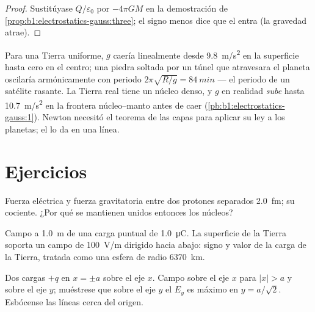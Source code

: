 \begin{proof}
Sustitúyase $Q/\varepsilon_0$ por $-4\pi GM$ en la demostración de
\cref{prop:b1:electrostatics-gauss:three}; el signo menos dice que el
 entra (la gravedad atrae).
\end{proof}

\begin{example}\label{ex:b1:electrostatics-gauss:earth}
Para una Tierra uniforme, $g$ caería linealmente desde \qty{9.8}{m/s^2} en
la superficie hasta cero en el centro; una piedra soltada por un túnel
que atravesara el planeta oscilaría armónicamente con periodo $2\pi\sqrt{R/g} =
\qty{84}{min}$ --- el periodo de un satélite rasante. La Tierra real
tiene un núcleo denso, y $g$ en realidad \emph{sube} hasta
\qty{10.7}{m/s^2} en la frontera núcleo--manto antes de caer (\cref{pb:b1:electrostatics-gauss:1}).
Newton necesitó el teorema de las capas para aplicar su ley a los
planetas; el  lo da en una línea.
\end{example}

\section{Ejercicios}

\begin{exercise}[$\star$]\label{exo:b1:electrostatics-gauss:1}
Fuerza eléctrica y fuerza gravitatoria entre dos protones separados
\qty{2.0}{fm}; su cociente. ¿Por qué se mantienen unidos entonces los núcleos?
\end{exercise}

\begin{exercise}[$\star$]\label{exo:b1:electrostatics-gauss:2}
Campo a \qty{1.0}{m} de una carga puntual de \qty{1.0}{\micro C}. La
superficie de la Tierra soporta un campo de \qty{100}{V/m} dirigido hacia
abajo: signo y valor de la carga de la Tierra, tratada como una esfera de
radio \qty{6370}{km}.
\end{exercise}

\begin{exercise}[$\star$]\label{exo:b1:electrostatics-gauss:3}
Dos cargas $+q$ en $x = \pm a$ sobre el eje $x$. Campo sobre el eje $x$
para $|x| > a$ y sobre el eje $y$; muéstrese que sobre el eje $y$ el $E_y$
es máximo en $y = a/\sqrt2$. Esbócense las líneas cerca del origen.
\end{exercise}

